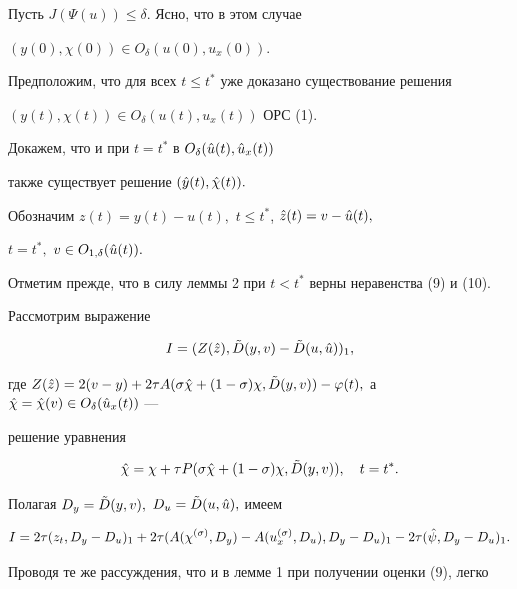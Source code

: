 Пусть $J(\Psi(u))\le \delta.$ Ясно, что в этом случае 


$(y(0),\chi(0))\in O_\delta(u(0),u_x(0)).$ 


 


Предположим, что для всех $t\le t^*$ уже доказано существование решения  


$(y(t),\chi(t))\in O_\delta(u(t),u_x(t))$ ОРС (1). 


Докажем, что и при $t=t^*$ в $O_\delta(\Hat u(t),\Hat u_x(t))$ 


также существует решение $(\Hat y(t),\Hat \chi(t)).$ 


 


Обозначим $z(t)=y(t)-u(t),$ $t\le t^*$, $\Hat z(t)=v-\Hat u(t),$ 


$t=t^*,$ $v\in O_{1,\delta}(\Hat u(t)).$ 


 


Отметим прежде, что в силу леммы 2 при $t<t^*$ верны неравенства (9) и (10). 


 


Рассмотрим выражение 


$$ 


I=(Z(\Hat z), \Tilde D(y,v)-\Tilde D(u,\Hat u))_1, 


$$ 


где $Z(\Hat z)=2(v-y)+2\tau A(\sigma\Hat\chi +(1-\sigma)\chi, 


\Tilde D(y,v))-\varphi(t),$ а $\Hat\chi=\Hat\chi(v)\in 


O_\delta(\Hat u_x(t))$ --- 


решение уравнения 


$$


\Hat \chi = \chi +\tau P(\sigma\Hat\chi+(1-\sigma)\chi, 


\Tilde D(y,v)),\quad t=t^*. 


$$


Полагая $D_y=\Tilde D(y,v),$ $D_u=\Tilde D(u,\Hat u),$ имеем 


$$ 


I=2\tau(z_t,D_y-D_u)_1 +2\tau(A(\chi^{(\sigma)},D_y) 


-A(u_x^{(\sigma)},D_u),D_y-D_u)_1- 2\tau(\Hat \psi,D_y-D_u)_1. 


$$ 


Проводя те же рассуждения, что и в лемме 1 при получении оценки (9), легко 



